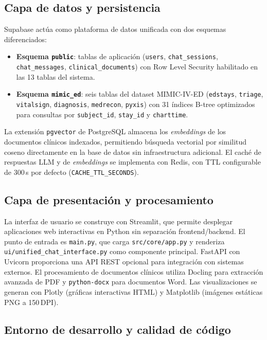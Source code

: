 \subsection{Capa de datos y persistencia}
\label{sec:stack_datos}

Supabase actúa como plataforma de datos unificada con dos esquemas diferenciados:

\begin{itemize}[nosep, leftmargin=*]
  \item \textbf{Esquema \texttt{public}}: tablas de aplicación (\texttt{users},
    \texttt{chat\_sessions}, \texttt{chat\_messages}, \texttt{clinical\_documents})
    con Row Level Security habilitado en las 13 tablas del sistema.
  \item \textbf{Esquema \texttt{mimic\_ed}}: seis tablas del dataset MIMIC-IV-ED
    (\texttt{edstays}, \texttt{triage}, \texttt{vitalsign}, \texttt{diagnosis},
    \texttt{medrecon}, \texttt{pyxis}) con 31 índices B-tree optimizados para
    consultas por \texttt{subject\_id}, \texttt{stay\_id} y \texttt{charttime}.
\end{itemize}

La extensión \texttt{pgvector} de PostgreSQL almacena los \textit{embeddings}
de los documentos clínicos indexados, permitiendo búsqueda vectorial por
similitud coseno directamente en la base de datos sin infraestructura adicional.
El caché de respuestas LLM y de \textit{embeddings} se implementa con Redis,
con TTL configurable de 300\,s por defecto (\texttt{CACHE\_TTL\_SECONDS}).

\subsection{Capa de presentación y procesamiento}
\label{sec:stack_frontend}

La interfaz de usuario se construye con Streamlit, que permite desplegar
aplicaciones web interactivas en Python sin separación frontend/backend.
El punto de entrada es \texttt{main.py}, que carga \texttt{src/core/app.py}
y renderiza \texttt{ui/unified\_chat\_interface.py} como componente principal.
FastAPI con Uvicorn proporciona una API REST opcional para integración con
sistemas externos. El procesamiento de documentos clínicos utiliza Docling
para extracción avanzada de PDF y \texttt{python-docx} para documentos Word.
Las visualizaciones se generan con Plotly (gráficas interactivas HTML) y
Matplotlib (imágenes estáticas PNG a 150\,DPI).

\subsection{Entorno de desarrollo y calidad de código}
\label{sec:entorno_desarrollo}

